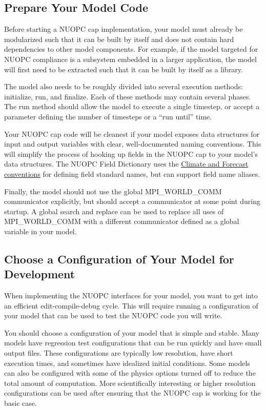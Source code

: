 \subsection{Prepare Your Model Code}
\label{sec:preparemodel}
Before starting a NUOPC cap implementation, your model must already
be modularized such that it can be built by itself and does not
contain hard dependencies to other model components.  For example,
if the model targeted for NUOPC compliance is a subsystem embedded
in a larger application, the model will first need to be extracted
such that it can be built by itself as a library.

The model also needs to be roughly divided into several execution
methods: initialize, run, and finalize.  Each of these methods may
contain several phases.  The run method should allow the model to
execute a single timestep, or accept a parameter defining the number of
timesteps or a ``run until'' time.

Your NUOPC cap code will be cleanest if your model exposes data
structures for input and output variables with clear, well-documented
naming conventions. This will simplify the process of hooking up fields
in the NUOPC cap to your model's data structures.  The NUOPC Field
Dictionary uses the \href{http://cfconventions.org/}{Climate and Forecast conventions}
for defining field standard names, but can support field name aliases.

Finally, the model should not use the global MPI\_WORLD\_COMM communicator
explicitly, but should accept a communicator at some point during
startup.  A global search and replace can be used to replace
all uses of MPI\_WORLD\_COMM with a different communicator defined
as a global variable in your model.


\subsection{Choose a Configuration of Your Model for Development}
\label{sec:chooseconfig}
When implementing the NUOPC interfaces for your model, you want to
get into an efficient edit-compile-debug cycle.  This will require
running a configuration of your model that can be used to test the
NUOPC code you will write.

You should choose a configuration of your model that is
simple and stable. Many models have regression test configurations
that can be run quickly and have small output files.  These configurations
are typically low resolution, have short execution times, and sometimes
have idealized initial conditions.  Some models can also be configured
with some of the physics options turned off to reduce the total amount
of computation.  More scientifically interesting or higher resolution configurations
can be used after ensuring that the NUOPC cap is working for the
basic case.

